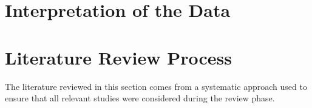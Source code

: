 


%
%
%
%


%
%
%
%
\section{Interpretation of the Data} \label{data_interpretation}








\section{Literature Review Process} \label{literature_review_process}
The literature reviewed in this section comes from a systematic approach used to ensure that all relevant studies were considered during the review phase.


